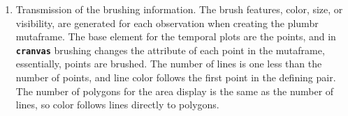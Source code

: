 \documentclass[12pt]{article}
\begin{document}
\begin{enumerate} \itemsep 0in
\item Transmission of the brushing information. The brush features, color, size, or visibility, are generated for each observation when creating the plumbr mutaframe.
The base element for the temporal plots are the points, and in \texttt{\textbf{cranvas}} brushing changes the attribute of each point in the mutaframe, essentially, points are brushed. The number of lines is one less than the number of points, and line color follows the first point in the defining pair. The number of polygons for the area display is the same as the number of lines, so color follows lines directly to polygons.





\end{enumerate}
\end{document}
